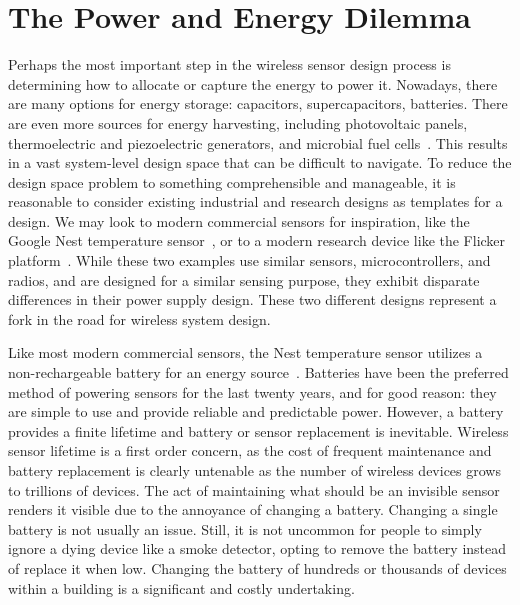 \section{The Power and Energy Dilemma}
Perhaps the most important step in the wireless sensor design process is determining how to allocate or capture the energy to power it. 
Nowadays, there are many options for energy storage: capacitors, supercapacitors, batteries. There are even more sources for energy harvesting, including photovoltaic panels, thermoelectric and piezoelectric generators, and microbial fuel cells~\cite{yervaGrafting12,campbellThermes14,campbell2018energy,josephson2020farming}.
This results in a vast system-level design space that can be difficult to navigate.
To reduce the design space problem to something comprehensible and manageable, it is reasonable to consider existing industrial and research designs as templates for a design.
We may look to modern commercial sensors for inspiration, like the Google Nest temperature sensor~\cite{googleNestTemperature}, or to a modern research device like the Flicker platform~\cite{hesterFlicker17}.
While these two examples use similar sensors, microcontrollers, and radios, and are designed for a similar sensing purpose, they exhibit disparate differences in their power supply design.
These two different designs represent a fork in the road for wireless system design.

Like most modern commercial sensors, the Nest temperature sensor utilizes a non-rechargeable battery for an energy source~\cite{googleNestTemperature}. 
Batteries have been the preferred method of powering sensors for the last twenty years, and for good reason: they are simple to use and provide reliable and predictable power.
However, a battery provides a finite lifetime and battery or sensor replacement is inevitable.
Wireless sensor lifetime is a first order concern, as the cost of frequent maintenance and battery replacement is clearly untenable as the number of wireless devices grows to trillions of devices. 
The act of maintaining what should be an invisible sensor renders it visible due to the annoyance of changing a battery.
Changing a single battery is not usually an issue. 
Still, it is not uncommon for people to simply ignore a dying device like a smoke detector, opting to remove the battery instead of replace it when low. 
Changing the battery of hundreds or thousands of devices within a building is a significant and costly undertaking.


